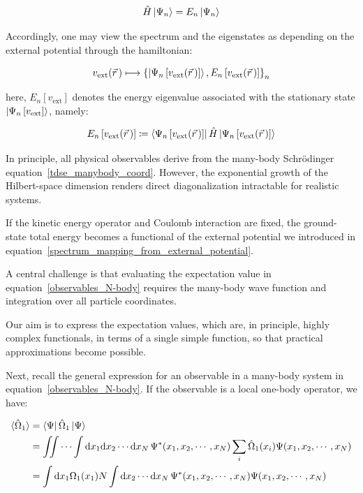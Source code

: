 \begin{equation}
    \hat{H}\ket{\Psi_n}=E_n\ket{\Psi_n}
\label{schrodinger_eigenvalue_equation}
\end{equation}

Accordingly, one may view the spectrum and the eigenstates as depending on the external potential through the hamiltonian:

\begin{equation}
    v_\mathrm{ext}(\vec{r}\,) \longmapsto \left\{\ket{\Psi_n\left[v_\mathrm{ext}(\vec{r}\,)\right]}, E_n\left[v_\mathrm{ext}(\vec{r}\,)\right]\right\}_{n}
\label{spectrum_mapping_from_external_potential}
\end{equation}

here, $E_n\left[v_\mathrm{ext}\right]$ denotes the energy eigenvalue associated with the stationary state $\ket{\Psi_n\left[v_\mathrm{ext}\right]}$, namely:

\begin{equation}
    E_n\left[v_\mathrm{ext}(\vec{r}\,)\right] \coloneqq
    \bra{\Psi_n\left[v_\mathrm{ext}(\vec{r}\,)\right]}\hat{H}\ket{\Psi_n\left[v_\mathrm{ext}(\vec{r}\,)\right]}
\label{eigenenergy_as_expectation_value}
\end{equation}

In principle, all physical observables derive from the many-body Schrödinger equation~\eqref{tdse_manybody_coord}.
However, the exponential growth of the Hilbert-space dimension renders direct diagonalization intractable for realistic systems.

If the kinetic energy operator and Coulomb interaction are fixed, the ground-state total energy becomes a functional of the external potential we introduced in equation~\eqref{spectrum_mapping_from_external_potential}.

A central challenge is that evaluating the expectation value in equation~\eqref{observables_N-body} requires the many-body wave function and integration over all particle coordinates.

Our aim is to express the expectation values, which are, in principle, highly complex functionals,
in terms of a single simple function, so that practical approximations become possible.

Next, recall the general expression for an observable in a many-body system in equation~\eqref{observables_N-body}.
If the observable is a local one-body operator, we have:

\begin{equation}
\begin{aligned}
    \braket{\hat\Omega_1}
    &= \bra{\Psi}\hat\Omega_1\ket{\Psi} \\
    &= \iint\cdots\int \mathrm{d}x_1\mathrm{d}x_2\cdots\mathrm{d}x_N\,\Psi^*(x_1,x_2,\cdots,x_N)\sum_{i}\hat\Omega_1(x_i)\Psi(x_1,x_2,\cdots,x_N) \\
    &= \int\mathrm{d}x_1\Omega_1(x_1)N\int\mathrm{d}x_2\cdots\mathrm{d}x_N\,\Psi^*(x_1,x_2,\cdots,x_N)\Psi(x_1,x_2,\cdots,x_N)
\end{aligned}
\label{observables_one-body}
\end{equation}


